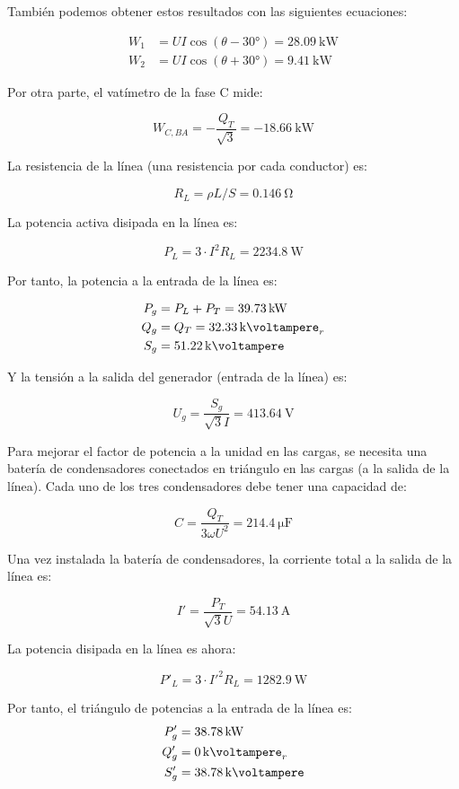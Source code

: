 \documentclass[12pt]{article}
\begin{document}
También podemos obtener estos resultados con las siguientes
ecuaciones:

\begin{align*}
  W_1 &= U I \cos(\theta - \ang{30}) = \SI{28.09}{\kilo\watt}\\
  W_2 &= U I \cos(\theta + \ang{30}) = \SI{9.41}{\kilo\watt}
\end{align*}

Por otra parte, el vatímetro de la fase C mide:

\[
  W_{C, BA} = - \frac{Q_T}{\sqrt{3}} = - \SI{18.66}{\kilo\watt}
\]

La resistencia de la línea (una resistencia por cada conductor) es:

\[
R_L = \rho L/S = \SI{0.146}{\ohm}
\]

La potencia activa disipada en la línea es:

\[
P_L = 3 \cdot I^2 R_L = \SI{2234.8}{\watt}
\]

Por tanto, la potencia a la entrada de la línea es:

\begin{align*}
P_g &= P_L + P_T = \SI{39.73}{\kilo\watt}\\
Q_g &= Q_T = \SI{32.33}{\kilo\voltampere}_r\\
S_g &= \SI{51.22}{\kilo\voltampere}
\end{align*}

Y la tensión a la salida del generador (entrada de la línea) es:

\[
U_g = \frac{S_g}{\sqrt{3} I} = \SI{413.64}{\volt}
\]

Para mejorar el factor de potencia a la unidad en las cargas, se necesita una batería de condensadores conectados en triángulo en las cargas (a la salida de la línea). Cada uno de los tres condensadores debe tener una capacidad de:

\[
C = \frac{Q_T}{3 \omega U^2} = \SI{214.4}{\micro\farad}
\]

Una vez instalada la batería de condensadores, la corriente total a la salida de la línea es:

\[
I' = \frac{P_T}{\sqrt{3} U} = \SI{54.13}{\ampere}
\]

La potencia disipada en la línea es ahora:

\[
P'_L = 3 \cdot I'^2 R_L = \SI{1282.9}{\watt} 
\]

Por tanto, el triángulo de potencias a la entrada de la línea es:
\begin{align*}
P'_g &= \SI{38.78}{\kilo\watt}\\
Q'_g &= \SI{0}{\kilo\voltampere}_r\\
S'_g &= \SI{38.78}{\kilo\voltampere}
\end{align*}
\end{document}
